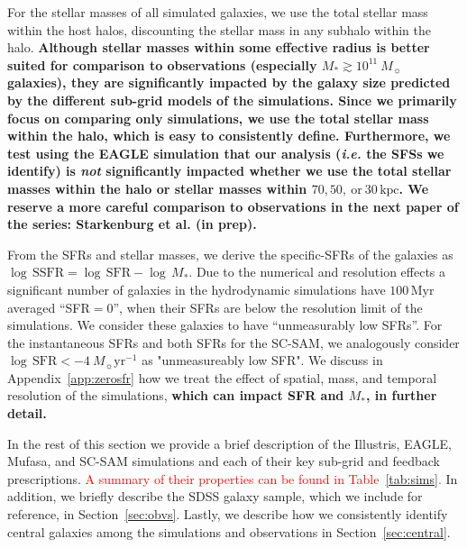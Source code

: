 \documentclass[tighten, preprint]{aastex62}
\begin{document}
For the stellar masses of all simulated galaxies, we use the total 
stellar mass within the host halos, discounting the stellar mass in 
any subhalo within the halo. 
{\bf \color{red} 
Although stellar masses within some effective radius is better suited 
for comparison to observations (especially $M_* \gtrsim 10^{11}\ M_{\sun}$ 
galaxies), they are significantly impacted by the galaxy size predicted 
by the different sub-grid models of the simulations. Since we primarily 
focus on comparing only simulations, we use the total stellar mass within 
the halo, which is easy to consistently define. Furthermore, we test using 
the EAGLE simulation that our analysis (\emph{i.e.} the SFSs we identify) 
is {\em not} significantly impacted whether we use the total stellar masses 
within the halo or stellar masses within $70, 50,~\mathrm{or}~30\,\mathrm{kpc}$. 
We reserve a more careful comparison to observations in the next paper of
the series: Starkenburg et al. (in prep). 
}

From the SFRs and stellar masses, we derive the specific-SFRs of the galaxies 
as $\log\,\mathrm{SSFR} = \log\,\mathrm{SFR} - \log\,M_*$. Due to the numerical 
and resolution effects a significant number of galaxies in the hydrodynamic 
simulations have $100\,\mathrm{Myr}$ averaged ``SFR$=0$'', when their SFRs 
are below the resolution limit of the simulations. We consider these galaxies 
to have ``unmeasurably low SFRs''. For the instantaneous SFRs and both SFRs for 
the SC-SAM, we analogously consider $\log\,\mathrm{SFR} < -4\ M_{\sun} \mathrm{yr}^{-1}$ 
as "unmeasureably low SFR". We discuss in Appendix~\ref{app:zerosfr} how 
we treat the effect of spatial, mass, and temporal resolution of the simulations, 
{\bf \color{red}
which can impact SFR and $M_*$, in further detail.
}

In the rest of this section we provide a brief description of the 
Illustris, EAGLE, {\sc Mufasa}, and SC-SAM simulations and each 
of their key sub-grid and feedback prescriptions. 
\textcolor{red}{A summary of their properties can be found in Table~\ref{tab:sims}.} 
In addition, we briefly describe the
SDSS galaxy sample, which we include for reference, in Section~\ref{sec:obvs}.
Lastly, we describe how we consistently identify central galaxies among 
the simulations and observations in Section~\ref{sec:central}. 
\end{document}

